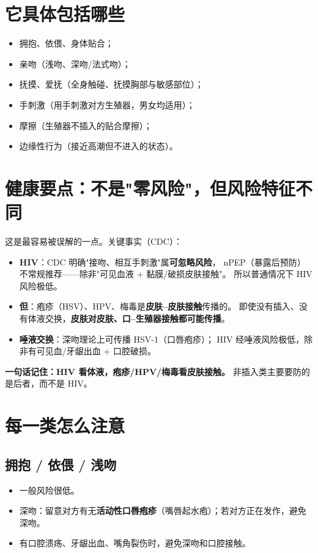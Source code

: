 \documentclass[12pt,UTF8,openany]{ctexbook}
\begin{document}
\section{它具体包括哪些}

\begin{itemize}[leftmargin=2em]
  \item 拥抱、依偎、身体贴合；
  \item 亲吻（浅吻、深吻/法式吻）；
  \item 抚摸、爱抚（全身触碰、抚摸胸部与敏感部位）；
  \item 手刺激（用手刺激对方生殖器，男女均适用）；
  \item 摩擦（生殖器不插入的贴合摩擦）；
  \item 边缘性行为（接近高潮但不进入的状态）。
\end{itemize}

\section{健康要点：不是"零风险"，但风险特征不同}

这是最容易被误解的一点。关键事实（CDC）：

\begin{itemize}[leftmargin=2em]
  \item \textbf{HIV}：CDC 明确"接吻、相互手刺激"属\textbf{可忽略风险}，
        nPEP（暴露后预防）不常规推荐——除非"可见血液 + 黏膜/破损皮肤接触"。
        所以普通情况下 HIV 风险极低。
  \item \textbf{但}：疱疹（HSV）、HPV、梅毒是\textbf{皮肤--皮肤接触}传播的。
        即使没有插入、没有体液交换，\textbf{皮肤对皮肤、口--生殖器接触都可能传播}。
  \item \textbf{唾液交换}：深吻理论上可传播 HSV-1（口唇疱疹）；
        HIV 经唾液风险极低，除非有可见血/牙龈出血 + 口腔破损。
\end{itemize}

\textbf{一句话记住：HIV 看体液，疱疹/HPV/梅毒看皮肤接触。}
非插入类主要要防的是后者，而不是 HIV。

\section{每一类怎么注意}

\subsection*{拥抱 / 依偎 / 浅吻}

\begin{itemize}[leftmargin=2em]
  \item 一般风险很低。
  \item 深吻：留意对方有无\textbf{活动性口唇疱疹}（嘴唇起水疱）；若对方正在发作，避免深吻。
  \item 有口腔溃疡、牙龈出血、嘴角裂伤时，避免深吻和口腔接触。
\end{itemize}
\end{document}
